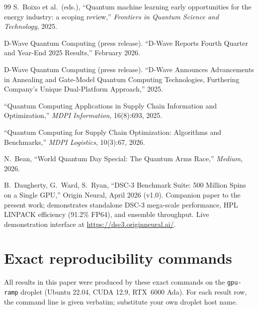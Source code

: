 \documentclass[11pt,a4paper]{article}
\begin{document}
\begin{thebibliography}{99}
S.\ Boixo et al.\ (eds.),
``Quantum machine learning early opportunities for the energy industry: a scoping review,''
\emph{Frontiers in Quantum Science and Technology}, 2025.

D-Wave Quantum Computing (press release).
``D-Wave Reports Fourth Quarter and Year-End 2025 Results,''
February 2026.

D-Wave Quantum Computing (press release).
``D-Wave Announces Advancements in Annealing and Gate-Model Quantum Computing Technologies, Furthering Company's Unique Dual-Platform Approach,''
2025.

``Quantum Computing Applications in Supply Chain Information and Optimization,''
\emph{MDPI Information}, 16(8):693, 2025.

``Quantum Computing for Supply Chain Optimization: Algorithms and Benchmarks,''
\emph{MDPI Logistics}, 10(3):67, 2026.

N.\ Bean, ``World Quantum Day Special: The Quantum Arms Race,''
\emph{Medium}, 2026.

B.\ Daugherty, G.\ Ward, S.\ Ryan,
``DSC-3 Benchmark Suite: 500 Million Spins on a Single GPU,''
Origin Neural, April 2026 (v1.0).
Companion paper to the present work; demonstrates standalone DSC-3
mega-scale performance, HPL LINPACK efficiency (91.2\% FP64), and
ensemble throughput. Live demonstration interface at
\url{https://dsc3.originneural.ai/}.

\end{thebibliography}

\appendix

\section{Exact reproducibility commands}
\label{appx:reproducibility}

All results in this paper were produced by these exact commands on the
\texttt{gpu-ramp} droplet (Ubuntu 22.04, CUDA 12.9, RTX~6000 Ada). For
each result row, the command line is given verbatim; substitute your
own droplet host name.
\end{document}
